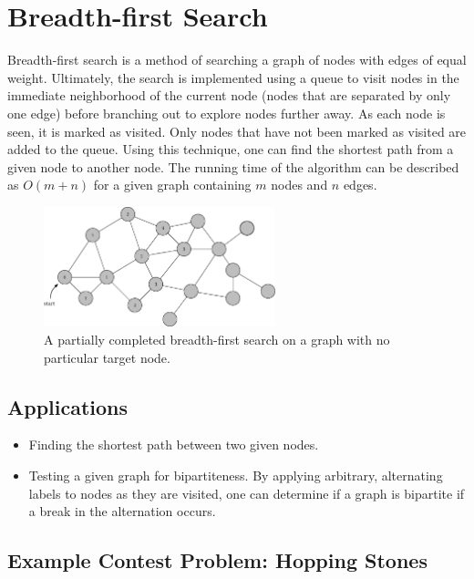 \section{Breadth-first Search}

Breadth-first search is a method of searching a graph of nodes with edges of equal weight.
Ultimately, the search is implemented using a queue to visit nodes in the immediate neighborhood of the current node (nodes that are separated by only one edge) before branching out to explore nodes further away.
As each node is seen, it is marked as visited.
Only nodes that have not been marked as visited are added to the queue.
Using this technique, one can find the shortest path from a given node to another node.
The running time of the algorithm can be described as $O(m + n)$ for a given graph containing $m$ nodes and $n$ edges.

\begin{figure}[h]
	\centering
	\includegraphics[width=0.6\textwidth]{./algorithms/breadth-first-search/partial-bfs}
	\caption{\small A partially completed breadth-first search on a graph with no particular target node.}
\end{figure}

\subsection{Applications}

\begin{itemize}
	\item Finding the shortest path between two given nodes.
	\item Testing a given graph for bipartiteness.
	By applying arbitrary, alternating labels to nodes as they are visited, one can determine if a graph is bipartite if a break in the alternation occurs.
\end{itemize}

\subsection{Example Contest Problem: Hopping Stones}

